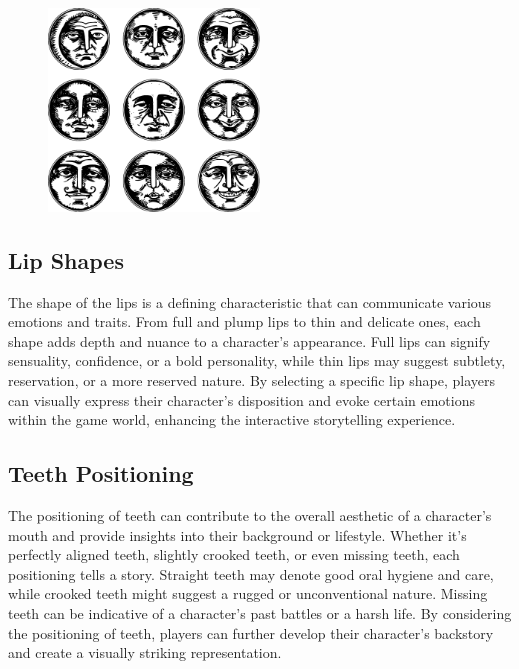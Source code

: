 \documentclass[12pt]{book}  %
\begin{document}
\begin{figure}[h]
    \centering
    \includegraphics[width=0.5\textwidth]{./images/physical_02.pdf}
\end{figure}

\subsection{\textbf{Lip Shapes}}

The shape of the lips is a defining characteristic that can communicate various emotions and traits. From full and plump lips to thin and delicate ones, each shape adds depth and nuance to a character's appearance. Full lips can signify sensuality, confidence, or a bold personality, while thin lips may suggest subtlety, reservation, or a more reserved nature. By selecting a specific lip shape, players can visually express their character's disposition and evoke certain emotions within the game world, enhancing the interactive storytelling experience.

\subsection{\textbf{Teeth Positioning}}

The positioning of teeth can contribute to the overall aesthetic of a character's mouth and provide insights into their background or lifestyle. Whether it's perfectly aligned teeth, slightly crooked teeth, or even missing teeth, each positioning tells a story. Straight teeth may denote good oral hygiene and care, while crooked teeth might suggest a rugged or unconventional nature. Missing teeth can be indicative of a character's past battles or a harsh life. By considering the positioning of teeth, players can further develop their character's backstory and create a visually striking representation.
\end{document}

